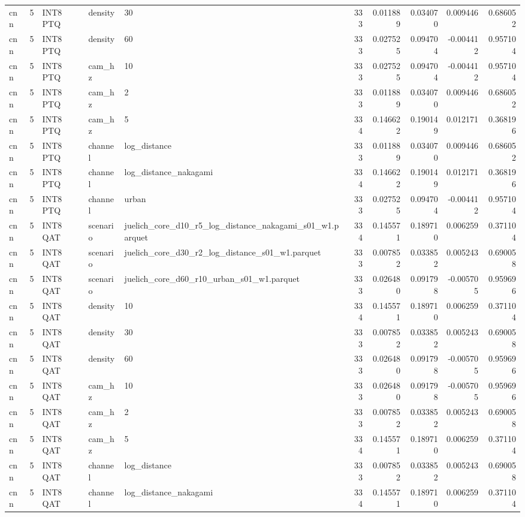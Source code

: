 \begin{tabular}{lrlllrrrrr}
cnn & 5 & INT8 PTQ & density & 30 & 333 & 0.011889 & 0.034070 & 0.009446 & 0.686052 \\
cnn & 5 & INT8 PTQ & density & 60 & 333 & 0.027525 & 0.094704 & -0.004412 & 0.957104 \\
cnn & 5 & INT8 PTQ & cam\_hz & 10 & 333 & 0.027525 & 0.094704 & -0.004412 & 0.957104 \\
cnn & 5 & INT8 PTQ & cam\_hz & 2 & 333 & 0.011889 & 0.034070 & 0.009446 & 0.686052 \\
cnn & 5 & INT8 PTQ & cam\_hz & 5 & 334 & 0.146622 & 0.190149 & 0.012171 & 0.368196 \\
cnn & 5 & INT8 PTQ & channel & log\_distance & 333 & 0.011889 & 0.034070 & 0.009446 & 0.686052 \\
cnn & 5 & INT8 PTQ & channel & log\_distance\_nakagami & 334 & 0.146622 & 0.190149 & 0.012171 & 0.368196 \\
cnn & 5 & INT8 PTQ & channel & urban & 333 & 0.027525 & 0.094704 & -0.004412 & 0.957104 \\
cnn & 5 & INT8 QAT & scenario & juelich\_core\_d10\_r5\_log\_distance\_nakagami\_s01\_w1.parquet & 334 & 0.145571 & 0.189710 & 0.006259 & 0.371104 \\
cnn & 5 & INT8 QAT & scenario & juelich\_core\_d30\_r2\_log\_distance\_s01\_w1.parquet & 333 & 0.007852 & 0.033852 & 0.005243 & 0.690058 \\
cnn & 5 & INT8 QAT & scenario & juelich\_core\_d60\_r10\_urban\_s01\_w1.parquet & 333 & 0.026480 & 0.091798 & -0.005705 & 0.959696 \\
cnn & 5 & INT8 QAT & density & 10 & 334 & 0.145571 & 0.189710 & 0.006259 & 0.371104 \\
cnn & 5 & INT8 QAT & density & 30 & 333 & 0.007852 & 0.033852 & 0.005243 & 0.690058 \\
cnn & 5 & INT8 QAT & density & 60 & 333 & 0.026480 & 0.091798 & -0.005705 & 0.959696 \\
cnn & 5 & INT8 QAT & cam\_hz & 10 & 333 & 0.026480 & 0.091798 & -0.005705 & 0.959696 \\
cnn & 5 & INT8 QAT & cam\_hz & 2 & 333 & 0.007852 & 0.033852 & 0.005243 & 0.690058 \\
cnn & 5 & INT8 QAT & cam\_hz & 5 & 334 & 0.145571 & 0.189710 & 0.006259 & 0.371104 \\
cnn & 5 & INT8 QAT & channel & log\_distance & 333 & 0.007852 & 0.033852 & 0.005243 & 0.690058 \\
cnn & 5 & INT8 QAT & channel & log\_distance\_nakagami & 334 & 0.145571 & 0.189710 & 0.006259 & 0.371104 \\

\end{tabular}

